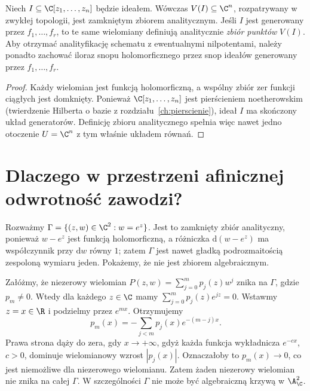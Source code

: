 \begin{stwierdzenie}
Niech $I\subseteq\C[z_1,\ldots,z_n]$ będzie ideałem. Wówczas
$V(I)\subseteq\C^n$, rozpatrywany w zwykłej topologii, jest
zamkniętym zbiorem analitycznym. Jeśli $I$ jest generowany przez $f_1,\ldots,f_r$, to te same
wielomiany definiują analitycznie \emph{zbiór punktów} $V(I)$.
Aby otrzymać analityfikację schematu z ewentualnymi nilpotentami,
należy ponadto zachować iloraz snopu holomorficznego przez snop
ideałów generowany przez $f_1,\ldots,f_r$.
\end{stwierdzenie}
\begin{proof}
Każdy wielomian jest funkcją holomorficzną, a wspólny zbiór zer
funkcji ciągłych jest domknięty. Ponieważ $\C[z_1,\ldots,z_n]$ jest
pierścieniem noetherowskim (twierdzenie Hilberta o bazie z
rozdziału~\ref{ch:pierscienie}), ideał $I$ ma skończony układ
generatorów. Definicję zbioru analitycznego spełnia więc nawet
jedno otoczenie $U=\C^n$ z tym właśnie układem równań.
\end{proof}

\section{Dlaczego w przestrzeni afinicznej odwrotność zawodzi?}
\label{sec:ga9-wykladnicza}

\begin{przyklad}
\label{prz:ga9-exp}
Rozważmy $\Gamma=\{(z,w)\in\C^2:w=e^z\}$.
Jest to zamknięty zbiór analityczny, ponieważ $w-e^z$ jest
funkcją holomorficzną, a różniczka $\mathrm d(w-e^z)$ ma współczynnik
przy $\mathrm dw$ równy $1$; zatem $\Gamma$ jest nawet gładką
podrozmaitością zespoloną wymiaru jeden. Pokażemy, że nie jest
zbiorem algebraicznym.

Załóżmy, że niezerowy wielomian $P(z,w)=\sum_{j=0}^m p_j(z)w^j$
znika na $\Gamma$, gdzie $p_m\ne0$. Wtedy dla każdego $z\in\C$
mamy $\sum_{j=0}^m p_j(z)e^{jz}=0$. Wstawmy $z=x\in\R$
i podzielmy przez $e^{mx}$. Otrzymujemy
\[
 p_m(x)=-\sum_{j<m}p_j(x)e^{-(m-j)x}.
\]
Prawa strona dąży do zera, gdy $x\to+\infty$, gdyż każda
funkcja wykładnicza $e^{-cx}$, $c>0$, dominuje wielomianowy
wzrost $|p_j(x)|$. Oznaczałoby to $p_m(x)\to0$, co jest niemożliwe
dla niezerowego wielomianu. Zatem żaden niezerowy wielomian
nie znika na całej $\Gamma$. W szczególności $\Gamma$ nie może
być algebraiczną krzywą w $\A^2_\C$.
\end{przyklad}

